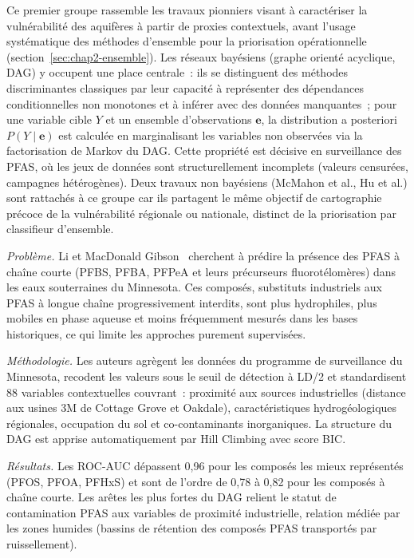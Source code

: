 Ce premier groupe rassemble les travaux pionniers visant \`a caract\'eriser la vuln\'erabilit\'e des aquif\`eres \`a partir de proxies contextuels, avant l'usage syst\'ematique des m\'ethodes d'ensemble pour la priorisation op\'erationnelle (section~\ref{sec:chap2-ensemble}).
Les r\'eseaux bay\'esiens (graphe orient\'e acyclique, DAG) y occupent une place centrale~: ils se distinguent des m\'ethodes discriminantes classiques par leur capacit\'e \`a repr\'esenter des d\'ependances conditionnelles non monotones et \`a inf\'erer avec des donn\'ees manquantes~; pour une variable cible $Y$ et un ensemble d'observations $\mathbf{e}$, la distribution a posteriori $P(Y \mid \mathbf{e})$ est calcul\'ee en marginalisant les variables non observ\'ees via la factorisation de Markov du DAG.
Cette propri\'et\'e est d\'ecisive en surveillance des PFAS, o\`u les jeux de donn\'ees sont structurellement incomplets (valeurs censur\'ees, campagnes h\'et\'erog\`enes).
Deux travaux non bay\'esiens (McMahon et al., Hu et al.) sont rattach\'es \`a ce groupe car ils partagent le m\^eme objectif de cartographie pr\'ecoce de la vuln\'erabilit\'e r\'egionale ou nationale, distinct de la priorisation par classifieur d'ensemble.


\label{sec:art-li2022}

\emph{Probl\`eme.}
Li et MacDonald Gibson~\cite{li2022pfas} cherchent \`a pr\'edire la pr\'esence des PFAS \`a cha\^ine courte (PFBS, PFBA, PFPeA et leurs pr\'ecurseurs fluorot\'elom\`eres) dans les eaux souterraines du Minnesota.
Ces compos\'es, substituts industriels aux PFAS \`a longue cha\^ine progressivement interdits, sont plus hydrophiles, plus mobiles en phase aqueuse et moins fr\'equemment mesur\'es dans les bases historiques, ce qui limite les approches purement supervis\'ees.

\emph{M\'ethodologie.}
Les auteurs agr\`egent les donn\'ees du programme de surveillance du Minnesota, recodent les valeurs sous le seuil de d\'etection \`a LD/2 et standardisent 88 variables contextuelles couvrant~: proximit\'e aux sources industrielles (distance aux usines 3M de Cottage Grove et Oakdale), caract\'eristiques hydrog\'eologiques r\'egionales, occupation du sol et co-contaminants inorganiques.
La structure du DAG est apprise automatiquement par Hill Climbing avec score BIC.

\emph{R\'esultats.}
Les ROC-AUC d\'epassent 0,96 pour les compos\'es les mieux repr\'esent\'es (PFOS, PFOA, PFHxS) et sont de l'ordre de 0,78 \`a 0,82 pour les compos\'es \`a cha\^ine courte.
Les ar\^etes les plus fortes du DAG relient le statut de contamination PFAS aux variables de proximit\'e industrielle, relation m\'edi\'ee par les zones humides (bassins de r\'etention des compos\'es PFAS transport\'es par ruissellement).

